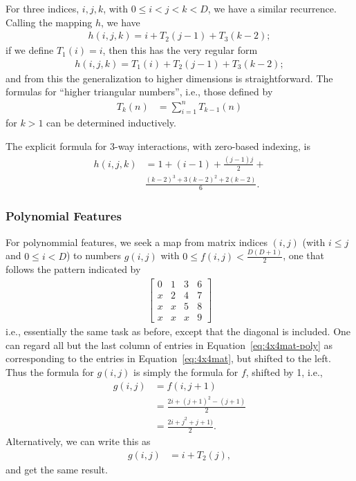 \documentclass{article} %
\begin{document}
For three indices, $i,j,k$, with $0 \le i < j < k < D$, we have a similar recurrence. Calling the mapping $h$, we have 
\begin{align}
h(i,j,k) = i + T_2(j-1) + T_3(k-2);
\end{align}
if we define $T_1(i) = i$, then this has the very regular form
\begin{align}
h(i,j,k) =  T_1(i) + T_2(j-1) + T_3(k-2);
\end{align}
and from this the generalization to higher dimensions is straightforward. The formulas for ``higher triangular numbers'', i.e., those defined by
\begin{align}
T_k(n) &= \sum_{i=1}^n T_{k-1}(n)
\end{align}
for $k > 1$ can be determined inductively.

The explicit formula for 3-way interactions, with zero-based indexing, is 
\begin{align}
h(i, j, k) &= 1 + (i-1) + \frac{(j-1)j}{2} + \\
& \frac{(k-2)^3 + 3(k-2)^2 + 2(k-2)}{6}. 
\end{align}

\subsubsection{Polynomial Features}
For polynommial features, we seek a map from matrix indices $(i, j)$ (with $i \le j$ and $0 \le i < D$) to numbers $g(i, j)$ with $0 \le f(i, j) < \frac{D(D+1)}{2}$, one that follows the pattern indicated by 
\begin{align}
\begin{bmatrix}
 0 & 1 & 3 & 6 \\
 x & 2 & 4 & 7\\
 x & x & 5 & 8 \\
 x & x & x & 9
\end{bmatrix}
\label{eq:4x4mat-poly}
\end{align}
i.e., essentially the same task as before, except that the diagonal is included. One can regard all but the last column of entries in Equation~\ref{eq:4x4mat-poly} as corresponding to the entries in Equation~\ref{eq:4x4mat}, but shifted to the left. Thus the formula for $g(i, j)$ is simply the formula for $f$, shifted by 1, i.e., 
\begin{align}
g(i, j) &= f(i, j+1)  \\
&=  \frac{2i + (j+1)^2-(j+1)}{2}\\
&=  \frac{2i + j^2 + j + 1)}{2}.
\end{align}
Alternatively, we can write this as
\begin{align}
g(i, j) &= i + T_2(j),
\end{align}
\noindent
and get the same result. 
\end{document}
